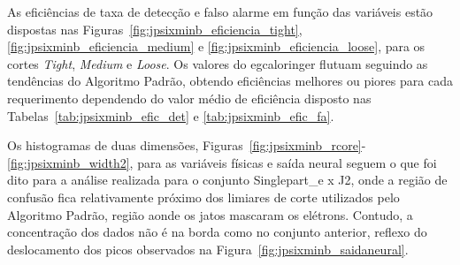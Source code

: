 As eficiências de taxa de detecção e falso alarme em função das variáveis estão
dispostas nas Figuras~\ref{fig:jpsixminb_eficiencia_tight},
\ref{fig:jpsixminb_eficiencia_medium} e \ref{fig:jpsixminb_eficiencia_loose},
para os cortes \emph{Tight}, \emph{Medium} e \emph{Loose}. Os valores do
\gls{egcaloringer} flutuam seguindo as tendências do Algoritmo Padrão, obtendo
eficiências melhores ou piores para cada requerimento dependendo do valor médio de 
eficiência disposto nas Tabelas~\ref{tab:jpsixminb_efic_det} e
\ref{tab:jpsixminb_efic_fa}.

Os histogramas de duas dimensões,
Figuras~\ref{fig:jpsixminb_rcore}-\ref{fig:jpsixminb_width2}, 
para as variáveis físicas e saída neural seguem
o que foi dito para a análise realizada para o conjunto Singlepart\_e x J2, onde
a região de confusão fica relativamente próximo dos limiares de corte utilizados
pelo Algoritmo Padrão, região aonde os jatos mascaram os elétrons.
Contudo, a concentração dos dados não é na borda como no conjunto anterior, 
reflexo do deslocamento dos picos observados na Figura~\ref{fig:jpsixminb_saidaneural}.


\begin{sidewaysfigure}[phb]
\centering
{}
\caption{Comparações das eficiências em função das variáveis $\eta$ e $E_{T}$
para ambos algoritmos no requerimento \emph{Loose}. Conjunto JPsi x Minbias.}
\label{fig:jpsixminb_eficiencia_tight}
\end{sidewaysfigure}

\begin{sidewaysfigure}[phb]
\centering
{}
\caption{Comparações das eficiências em função das variáveis $\eta$ e $E_{T}$
para ambos algoritmos no requerimento \emph{Medium}. Conjunto JPsi x Minbias.}
\label{fig:jpsixminb_eficiencia_medium}
\end{sidewaysfigure}

